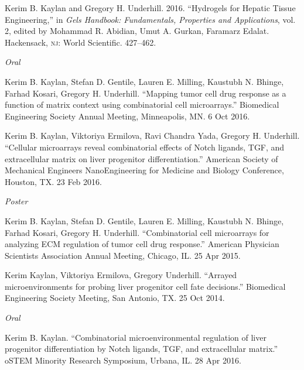 \documentclass[11pt,article,oneside]{memoir}
\begin{document}
\ind Kerim B. Kaylan and Gregory H. Underhill. 2016. ``Hydrogels for Hepatic Tissue Engineering,'' in \emph{Gels Handbook: Fundamentals, Properties and Applications}, vol. 2, edited by Mohammad R. Abidian, Umut A. Gurkan, Faramarz Edalat. Hackensack, \textsc{nj}: World Scientific. 427--462.


\bigskip 


\noindent\textit{Oral \vspace{0.05in}}

\ind Kerim B. Kaylan, Stefan D. Gentile, Lauren E. Milling, Kaustubh N. Bhinge, Farhad Kosari, Gregory H. Underhill. ``Mapping tumor cell drug response as a function of matrix context using combinatorial cell microarrays.'' Biomedical Engineering Society Annual Meeting, Minneapolis, MN. 6 Oct 2016.

\ind Kerim B. Kaylan, Viktoriya Ermilova, Ravi Chandra Yada, Gregory H. Underhill. ``Cellular microarrays reveal combinatorial effects of Notch ligands, TGF\textbeta, and extracellular matrix on liver progenitor differentiation.'' American Society of Mechanical Engineers NanoEngineering for Medicine and Biology Conference, Houston, TX. 23 Feb 2016.

\bigskip

\noindent\textit{Poster \vspace{0.05in}}

\ind Kerim B. Kaylan, Stefan D. Gentile, Lauren E. Milling, Kaustubh N. Bhinge, Farhad Kosari, Gregory H. Underhill. ``Combinatorial cell microarrays for analyzing ECM regulation of tumor cell drug response.'' American Physician Scientists Association Annual Meeting, Chicago, IL. 25 Apr 2015.

\ind Kerim Kaylan, Viktoriya Ermilova, Gregory Underhill. ``Arrayed microenvironments for probing liver progenitor cell fate decisions.'' Biomedical Engineering Society Meeting, San Antonio, TX. 25 Oct 2014.


\noindent\emph{Oral\vspace{0.05in}}

\ind Kerim B. Kaylan. ``Combinatorial microenvironmental regulation of liver progenitor differentiation by Notch ligands, TGF\textbeta, and extracellular matrix.'' oSTEM Minority Research Symposium, Urbana, IL. 28 Apr 2016.
\end{document}
